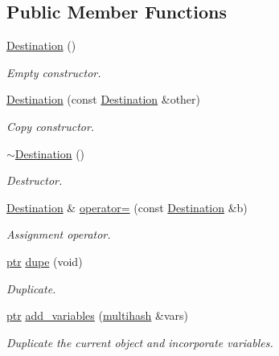 \subsection*{Public Member Functions}
\begin{DoxyCompactItemize}
\item 
\hyperlink{class_photo_finish_1_1_destination_ada09c94b6f5f555bb3163bf1d28f0d69}{Destination} ()
\begin{DoxyCompactList}\small\item\em Empty constructor. \end{DoxyCompactList}\item 
\hyperlink{class_photo_finish_1_1_destination_acfa92e5c9d061871a842371fb04e5a3e}{Destination} (const \hyperlink{class_photo_finish_1_1_destination}{Destination} \&other)
\begin{DoxyCompactList}\small\item\em Copy constructor. \end{DoxyCompactList}\item 
\hyperlink{class_photo_finish_1_1_destination_aa40a461fbb7dcf5a628967cfc647aeb2}{$\sim$\+Destination} ()
\begin{DoxyCompactList}\small\item\em Destructor. \end{DoxyCompactList}\item 
\hyperlink{class_photo_finish_1_1_destination}{Destination} \& \hyperlink{class_photo_finish_1_1_destination_a55a37b1751bb96051e81b7940aa9efb0}{operator=} (const \hyperlink{class_photo_finish_1_1_destination}{Destination} \&b)
\begin{DoxyCompactList}\small\item\em Assignment operator. \end{DoxyCompactList}\item 
\hyperlink{class_photo_finish_1_1_destination_a0d282a905cd81c3f0e6d7233c9bc7774}{ptr} \hyperlink{class_photo_finish_1_1_destination_a78d6a23570b288c6bc2bd4bd38798695}{dupe} (void)
\begin{DoxyCompactList}\small\item\em Duplicate. \end{DoxyCompactList}\item 
\hyperlink{class_photo_finish_1_1_destination_a0d282a905cd81c3f0e6d7233c9bc7774}{ptr} \hyperlink{class_photo_finish_1_1_destination_a1cb318744749f6c2e2919e61651345df}{add\+\_\+variables} (\hyperlink{namespace_photo_finish_a6f41796f162687538b7da5c7a95e2d18}{multihash} \&vars)
\begin{DoxyCompactList}\small\item\em Duplicate the current object and incorporate variables. \end{DoxyCompactList}\item 

\end{DoxyCompactItemize}
